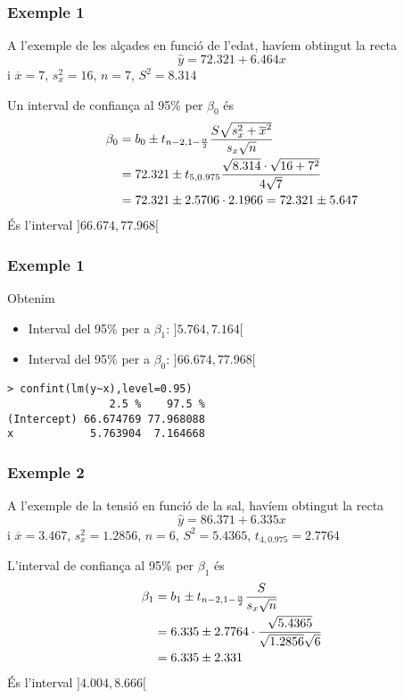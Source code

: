 \documentclass[12pt,t]{beamer}
\theoremstyle{plain}
\theoremstyle{definition}
\begin{document}
\begin{frame}
\frametitle{Exemple 1}
\vspace*{-2ex}

A l'exemple de les alçades en funció de l'edat, havíem obtingut la recta
$$
\widehat{y}=72.321+6.464x
$$
i $\overline{x}=7$, $s_x^2=16$, $n=7$, $S^2=8.314$
\medskip

Un interval de confiança al 95\% per $\beta_0$ és
$$
\begin{array}{l}
\displaystyle \beta_0=b_0\pm t_{n-2,1-\frac{\alpha}{2}}\frac{S\sqrt{s_x^2+\overline{x}^2}}{s_x\sqrt{n}}
\\[2ex]
\displaystyle\hphantom{\beta_0}=72.321\pm t_{5,0.975} \frac{\sqrt{8.314}\cdot\sqrt{16+7^2}}{4\sqrt{7}}\\[2ex]
\hphantom{\beta_0} =
72.321\pm 2.5706 \cdot 2.1966=72.321\pm 5.647
\end{array}
$$
És l'interval $]66.674,77.968[$

\end{frame}






\begin{frame}[fragile]
\frametitle{Exemple 1}
\vspace*{-2ex}

Obtenim
\begin{itemize}
\item Interval del 95\% per a $\beta_1$: $]5.764,7.164[$
\medskip

\item Interval del 95\% per a $\beta_0$: $]66.674,77.968[$
\end{itemize}
\begin{verbatim}
> confint(lm(y~x),level=0.95)
                2.5 %    97.5 %
(Intercept) 66.674769 77.968088
x            5.763904  7.164668
\end{verbatim}

\end{frame}



\begin{frame}
\frametitle{Exemple 2}


A l'exemple de la tensió en funció de la sal, havíem obtingut la recta
$$
\widehat{y}=86.371+6.335x
$$
i $\overline{x}=3.467$, $s_x^2=1.2856$, $n=6$, $S^2=5.4365$, $t_{4,0.975}=2.7764$
\medskip

L'interval de confiança al 95\% per $\beta_1$ és\pause
$$
\begin{array}{l}
\displaystyle \beta_1=b_1\pm t_{n-2,1-\frac{\alpha}{2}} \frac{S}{s_x\sqrt{n}}
\\[2ex]
\displaystyle\hphantom{\beta_1} =6.335\pm 2.7764 \cdot\frac{\sqrt{5.4365}}{\sqrt{1.2856}\sqrt{6}}\\[2ex]
\hphantom{\beta_1} = 6.335\pm 2.331
\end{array}
$$
És l'interval $]4.004,8.666[$

\end{frame}
\end{document}
